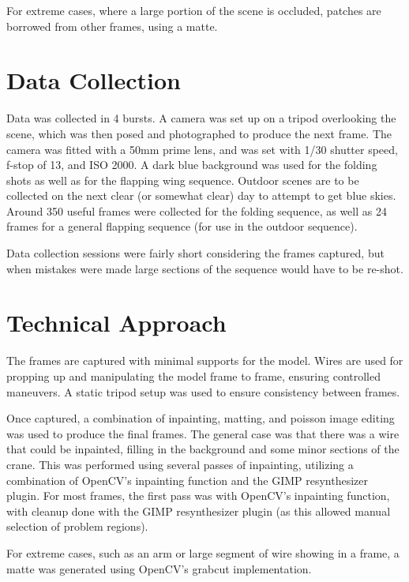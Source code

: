 \documentclass[12pt]{article}
\begin{document}
        For extreme cases, where a large portion of the scene is occluded, patches are borrowed from other frames, using a matte.  
        
    \section{Data Collection}
        Data was collected in 4 bursts.  A  camera was set up on a tripod overlooking the scene, which was then posed and photographed to produce the next frame.  The camera was fitted with a 50mm prime lens, and was set with 1/30 shutter speed, f-stop of 13, and ISO 2000.  A dark blue background was used for the folding shots as well as for the flapping wing sequence.  Outdoor scenes are to be collected on the next clear (or somewhat clear) day to attempt to get blue skies.  Around 350 useful frames were collected for the folding sequence, as well as 24 frames for a general flapping sequence (for use in the outdoor sequence).

        Data collection sessions were fairly short considering the frames captured, but when mistakes were made large sections of the sequence would have to be re-shot.
        
    \section{Technical Approach}
        The frames are captured with minimal supports for the model.  Wires are used for propping up and manipulating the model frame to frame, ensuring controlled maneuvers.  A static tripod setup was used to ensure consistency between frames.    

        Once captured, a combination of inpainting, matting, and poisson image editing was used to produce the final frames.  The general case was that there was a wire that could be inpainted, filling in the background and some minor sections of the crane.  This was performed using several passes of inpainting, utilizing a combination of OpenCV's inpainting function and the GIMP resynthesizer plugin.  For most frames, the first pass was with OpenCV's inpainting function, with cleanup done with the GIMP resynthesizer plugin (as this allowed manual selection of problem regions).  

        For extreme cases, such as an arm or large segment of wire showing in a frame, a matte was generated using OpenCV's grabcut implementation.  
        
\end{document}
